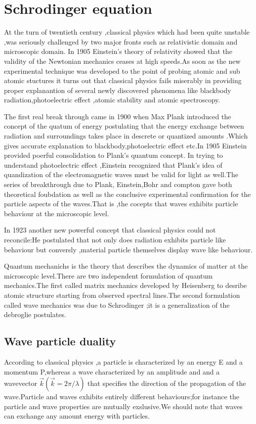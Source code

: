 \chapter{Schrodinger equation}
 At the turn of twentieth century ,classical physics which had been quite unstable ,was seriously challenged by two major fronts such as relativistic domain and microscopic domain. In 1905 Einstein's theory of relativity showed that the validity of the Newtonian mechanics ceases at high speeds.As soon as the new experimental technique was developed to the point of probing atomic and sub atomic stuctures it turns out that classical physics fails miserably in providing proper explanantion of several newly discovered phenomena like blackbody radiation,photoelectric effect ,atomic stability and atomic spectroscopy.
  \par The first real break through came in 1900 when Max Plank introduced the concept of the quatum of energy postulating that the energy exchange between radiation and surroundings takes place in descrete or quantized amounts .Which gives accurate explanation to blackbody,photoelectric effect etc.In 1905 Einstein provided poerful consolidation to Plank's quantum concept. In trying to understand photoelectric effect ,Einstein recognized that Plank's idea of quandization of the electromagnetic waves must be valid for light as well.The series of breakthrough due to Plank, Einstein,Bohr and compton gave both theoretical foubdation as well as the conclusive experimental confirmation for the particle aspects of the waves.That is ,the cocepts that waves exhibits particle behaviour at the microscopic level.
  \par In 1923 another new powerful concept that classical physics could not reconcile:He postulated that not only does radiation exhibits particle like behaviour but conversly ,material particle themselves display wave like behaviour.
  \par Quantum mechanichs is the theory that describes the dynamics of matter at the microscopic level.There are two independent formulation of quantum mechanics.The first called matrix mechanics developed by Heisenberg to desribe atomic structure starting from observed spectral lines.The second formulation called wave mechanics was due to Schrodinger ;it is a generalization of the debroglie postulates.
  \section{Wave particle duality}
    According to classical physics ,a particle is characterized by an energy E and a momentum P,whereas a wave characterized by an amplitude and and a wavevector $\vec{k}(\vec{k}=2\pi/\lambda)$ that specifies the direction of the propagation of the wave.Particle and waves exhibits entirely different behaviours;for instance the particle and wave properties are mutually exslusive.We should note that waves can exchange any amount energy with particles.
